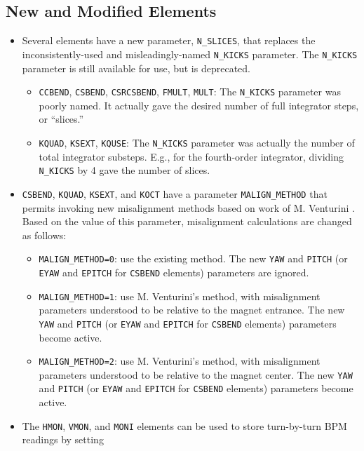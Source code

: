 \documentclass[11pt]{article}
\begin{document}
\subsection{New and Modified Elements}
\begin{itemize}
\item Several elements have a new parameter,  \verb|N_SLICES|, that replaces the inconsistently-used and misleadingly-named
  \verb|N_KICKS| parameter. The \verb|N_KICKS| parameter is still available for use, but is deprecated.
  \begin{itemize}
  \item \verb|CCBEND|, \verb|CSBEND|, \verb|CSRCSBEND|, \verb|FMULT|, \verb|MULT|: The \verb|N_KICKS| parameter was
    poorly named. It actually gave the desired number of full integrator steps, or ``slices.''
  \item \verb|KQUAD|, \verb|KSEXT|, \verb|KQUSE|: The \verb|N_KICKS| parameter was actually the number of total
    integrator substeps. E.g., for the fourth-order integrator, dividing \verb|N_KICKS| by 4 gave the number of slices.
  \end{itemize}
\item \verb|CSBEND|, \verb|KQUAD|, \verb|KSEXT|,  and \verb|KOCT| have a parameter \verb|MALIGN_METHOD| that permits
  invoking new misalignment methods based on work of M. Venturini \cite{Venturini2021}. Based on the value of this parameter, misalignment
  calculations are changed as follows:
  \begin{itemize}
    \item \verb|MALIGN_METHOD=0|: use the existing method.
      The new \verb|YAW| and \verb|PITCH| (or \verb|EYAW| and \verb|EPITCH| for \verb|CSBEND| elements)
      parameters are ignored.
    \item \verb|MALIGN_METHOD=1|: use M. Venturini's method, with misalignment parameters understood to be relative
      to the magnet entrance. The new \verb|YAW| and \verb|PITCH| (or \verb|EYAW| and \verb|EPITCH| for \verb|CSBEND| elements)
      parameters become active.
    \item \verb|MALIGN_METHOD=2|: use M. Venturini's method, with misalignment parameters understood to be relative
      to the magnet center. The new \verb|YAW| and \verb|PITCH| (or \verb|EYAW| and \verb|EPITCH| for \verb|CSBEND| elements)
      parameters become active.
    \end{itemize}
  \item The \verb|HMON|, \verb|VMON|, and \verb|MONI| elements can be used to store turn-by-turn BPM readings by setting

\end{itemize}
\end{document}
